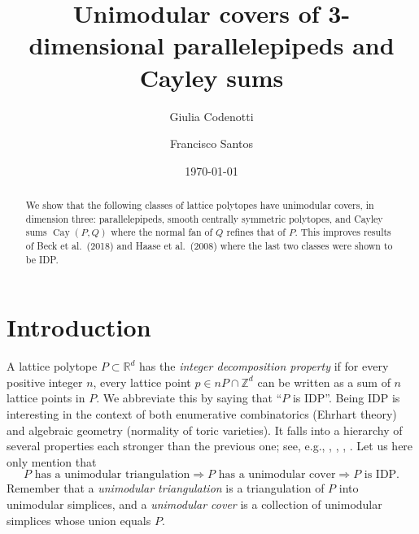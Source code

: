 \documentclass{amsart}
\date{\today}
\author[G.~Codenotti]{Giulia Codenotti}
\author[F.~Santos]{Francisco Santos}
\title{Unimodular covers of 3-dimensional parallelepipeds and Cayley sums}
\theoremstyle{plain}
\theoremstyle{definition}
\newcommand{\Z}{ \ensuremath{\mathbb{Z}}}
\newcommand{\R}{ \ensuremath{\mathbb{R}}}
\newcommand{\cayley}{\operatorname{Cay}}
\begin{document}
\begin{abstract}
We show that the following classes of lattice polytopes have unimodular covers, in dimension three:  parallelepipeds,  smooth centrally symmetric polytopes, and  Cayley sums $\cayley(P,Q)$ where the normal fan of $Q$ refines that of $P$. This improves results of Beck et al.~(2018) and Haase et al.~(2008) where the last two classes were shown to be IDP.
\end{abstract}

\maketitle


\section{Introduction}

A lattice polytope $P\subset \R^d$ has the \emph{integer decomposition property} if for every positive integer $n$, every lattice point $p \in nP\cap \Z^d$ can be written as a sum of $n$ lattice points in $P$. We abbreviate this by saying that ``$P$ is IDP''. Being IDP is interesting in the context of  both enumerative combinatorics (Ehrhart theory) and algebraic geometry (normality of toric varieties). It falls into a hierarchy of several properties each stronger than the previous one; see, e.g., \cite[Section 2.D]{BGbook}, \cite[Sect. 1.2.5]{HPPS-survey}, \cite[p. 2097]{mfo2004}, \cite[p. 2313]{mfo2007}.
Let us here only mention that
\[
P \text{ has a unimodular triangulation}\Rightarrow
P \text{ has a unimodular cover}\Rightarrow
P \text{ is IDP.}
\]
Remember that a \emph{unimodular triangulation} is a triangulation of $P$ into unimodular simplices, and a \emph{unimodular cover} is a collection of unimodular simplices whose union equals $P$. 
\end{document}
